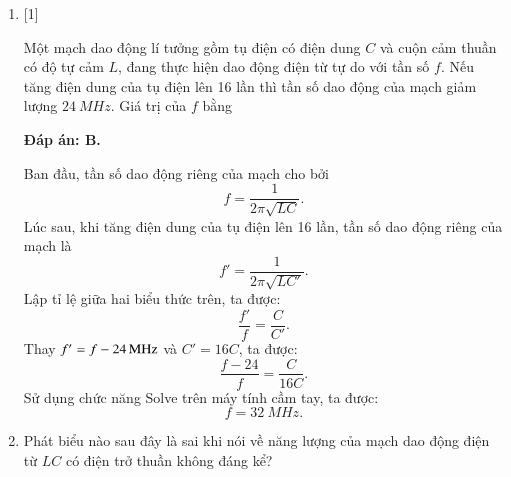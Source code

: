 \begin{enumerate}[label=\bfseries Câu \arabic*:]
	\item {} [1] %
	
	{Một mạch dao động lí tưởng gồm tụ điện có điện dung $C$ và cuộn cảm thuần có độ tự cảm $L$, đang thực hiện dao động điện từ tự do với tần số $f$. Nếu tăng điện dung của tụ điện lên 16 lần thì tần số dao động của mạch giảm lượng $\SI{24}{MHz}$. Giá trị của $f$ bằng
	}
	
	\hideall
	{		\textbf{Đáp án: B.}
		
		Ban đầu, tần số dao động riêng của mạch cho bởi 
		$$f = \dfrac{1}{2\pi \sqrt{LC}}.$$
		Lúc sau, khi tăng điện dung của tụ điện lên 16 lần, tần số dao động riêng của mạch là
		$$f' = \dfrac{1}{2\pi \sqrt{LC'}}.$$
		Lập tỉ lệ giữa hai biểu thức trên, ta được:
		$$\dfrac{f'}{f} = \dfrac{C}{C'}.$$
		Thay $\xsi{f' = f - 24}{MHz}$ và $C' = 16C$, ta được:
		$$\dfrac{f - 24}{f} = \dfrac{C}{16C}.$$
		Sử dụng chức năng Solve trên máy tính cầm tay, ta được:
		$$f = \SI{32}{MHz}.$$
		
	}
		\item {}
	
	{Phát biểu nào sau đây là sai khi nói về năng lượng của mạch dao động điện từ $LC$ có điện trở thuần không đáng kể?
		
	}
	

\end{enumerate}
